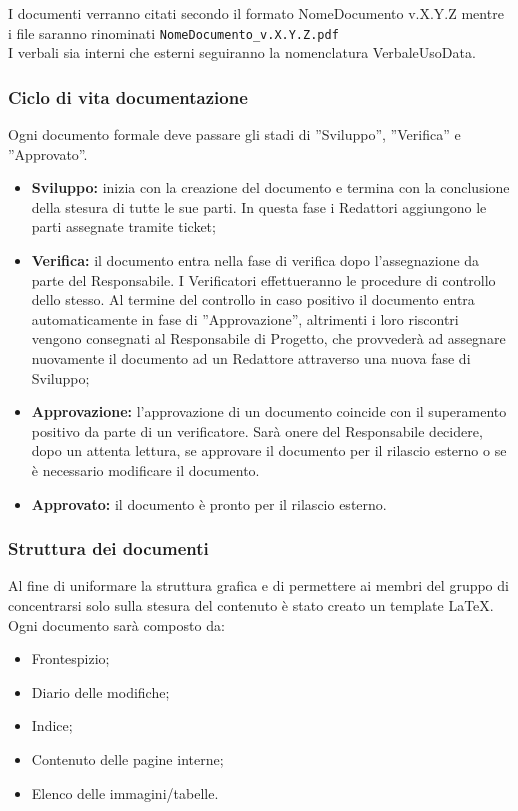 I documenti verranno citati secondo il formato NomeDocumento v.X.Y.Z mentre i file saranno rinominati \texttt{NomeDocumento\_v.X.Y.Z.pdf} \\
I verbali sia interni che esterni seguiranno la nomenclatura VerbaleUsoData.

\subsubsection{Ciclo di vita documentazione}
Ogni documento formale deve passare gli stadi di ”Sviluppo”, ”Verifica” e ”Approvato”.
\begin{itemize}
	\item \textbf{Sviluppo:} inizia con la creazione del documento e termina con la conclusione	della stesura di tutte le sue parti. In questa fase i Redattori aggiungono le parti assegnate tramite ticket;
	
	\item  \textbf{Verifica:} il documento entra nella fase di verifica dopo l’assegnazione da
	parte del Responsabile. I Verificatori effettueranno le procedure di controllo
	dello stesso.
	Al termine del controllo in caso positivo il documento entra automaticamente
	in fase di ”Approvazione”, altrimenti i loro riscontri vengono consegnati
	al Responsabile di Progetto, che provvederà ad assegnare nuovamente il
	documento ad un Redattore attraverso una nuova fase di Sviluppo;
	
	\item  \textbf{Approvazione:} l’approvazione di un documento coincide con il superamento
	positivo da parte di un verificatore. 
	Sarà onere del Responsabile decidere, dopo un attenta lettura, se approvare il documento per il rilascio esterno o se è necessario modificare il documento.

	
	\item  \textbf{Approvato:} il documento è pronto per il rilascio esterno.
\end{itemize}


\subsubsection{Struttura dei documenti}
Al fine di uniformare la struttura grafica e di permettere ai membri del gruppo di concentrarsi solo sulla stesura del contenuto è stato creato un template \LaTeX.
Ogni documento sarà composto da:
\begin{itemize}
	\item Frontespizio;
	\item Diario delle modifiche;
	\item Indice;
	\item Contenuto delle pagine interne;
	\item Elenco delle immagini/tabelle.
\end{itemize}
